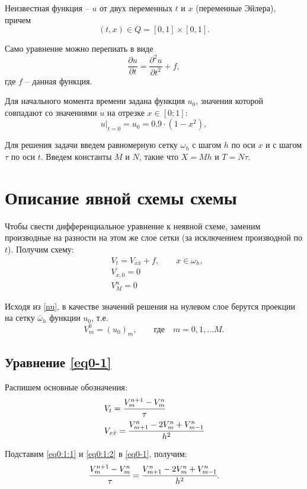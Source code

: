 \documentclass[12pt]{extarticle}
\numberwithin{equation}{section}
\begin{document}
Неизвестная функция -- $u$ от двух переменных $t$ и $x$ (переменные Эйлера), причем $$(t, x) \in Q = [0, 1] \times [0, 1].$$

Само уравнение можно перепиать в виде
\begin{equation}
\frac{\partial u}{\partial t} = \frac{\partial ^2 u}{\partial t^2} + f, \label{eq1}
\end{equation}
где $f$ -- данная функция.

Для начального момента  времени задана функция $u_0$, значения которой совпадают со значениями $u$ на отрезке $x \in [0; 1]$:
\begin{equation}
u |_{t=0} = u_0 = 0.9 \cdot (1 - x^2), \label{nu}
\end{equation}

Для решения задачи введем равномерную сетку $\omega_h$ с шагом $h$ по оси $x$ и с шагом $\tau$ по оси $t$. 
Введем константы $M$ и $N$, такие что $X = Mh$ и $T = N\tau$.

\section{Описание явной схемы схемы} \label{scheme0}
Чтобы свести дифференциальное уравнение к неявной схеме, заменим производные на разности на этом же слое сетки (за исключением производной по $t$).
Получим схему:
	\begin{align}
		&V_t= V_{x \hat x} + f,\qquad x \in \omega_h, \label{eq0-1}\\
		&V_{x, 0} = 0 \label{eq0-2}\\
		&{V^n_M} = 0 \label{eq0-3}
	\end{align}

Исходя из \ref{nu}, в качестве значений решения на нулевом слое берутся проекции на сетку $\bar{\omega}_h$ функции $u_0$, т.е.
$$V_m^0 = (u_0)_m, \qquad \mbox{где} \quad m = 0, 1, \dots M.$$

\subsection{Уравнение \ref{eq0-1}}
Распишем основные обозначения:
\begin{align*}
&V_t = \cfrac{V_m^{n+1} - V_m^n}{\tau} \label{eq0:1:1}\\
&V_{x \hat x} = \cfrac{V_{m+1}^{n} - 2V_m^{n} + V_{m-1}^{n}}{h^2} \label{eq0:1:2}
\end{align*}

Подставим \ref{eq0:1:1} и \ref{eq0:1:2} в \ref{eq0-1}, получим:
\begin{equation}
\cfrac{V_m^{n+1} - V_m^n}{\tau} = \cfrac{V_{m+1}^{n} - 2V_m^{n} + V_{m-1}^{n}}{h^2}. \label{sc}
\end{equation}
\end{document}
